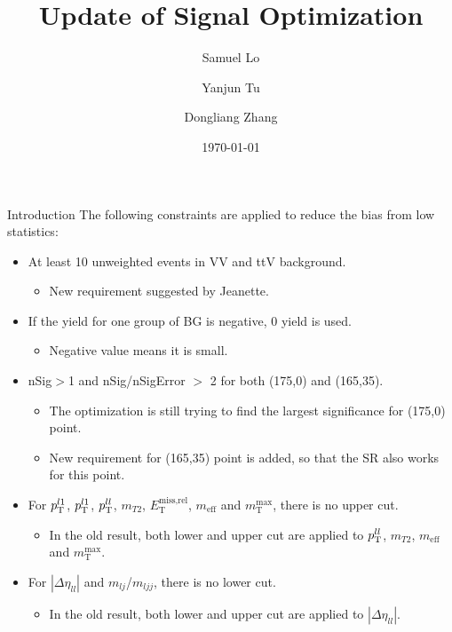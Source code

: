\documentclass[mathserif,serif]{beamer}
\title[]{Update of Signal Optimization}
\author[]
{
Samuel Lo \inst{1}
\and
Yanjun Tu  \inst{1}
\and
Dongliang Zhang  \inst{2}
}
\institute[]
{
\inst{1}
The University of Hong Kong
\and
\inst{2}
University of Michigan
}
\date[]{\today}
\begin{document}
\frame{\titlepage}

\begin{frame}{Introduction}
The following constraints are applied to reduce the bias from low statistics:
\begin{itemize}
\item At least 10 unweighted events in VV and ttV background.
\begin{itemize}
\item New requirement suggested by Jeanette.
\end{itemize}
\item If the yield for one group of BG is negative, 0 yield is used.
\begin{itemize}
\item Negative value means it is small.
\end{itemize}
\item nSig$>$1 and nSig/nSigError $>$ 2 for both (175,0) and (165,35).
\begin{itemize}
\item The optimization is still trying to find the largest significance for (175,0) point.
\item New requirement for (165,35) point is added, so that the SR also works for this point.
\end{itemize}
\item For $p_{\text{T}}^{l1}$, $p_{\text{T}}^{l1}$, $p_{\text{T}}^{ll}$, $m_{T2}$, $E_{\text{T}}^{\text{miss,rel}}$, $m_{\text{eff}}$ and $m_{\text{T}}^{\text{max}}$, there is no upper cut.
\begin{itemize}
\item In the old result, both lower and upper cut are applied to $p_{\text{T}}^{ll}$,  $m_{T2}$, $m_{\text{eff}}$ and $m_{\text{T}}^{\text{max}}$.
\end{itemize}
\item For $|\Delta\eta_{ll}|$ and $m_{lj}$/$m_{ljj}$, there is no lower cut.
\begin{itemize}
\item In the old result, both lower and upper cut are applied to $|\Delta\eta_{ll}|$.
\end{itemize}
\end{itemize}
\end{frame}
\end{document}
